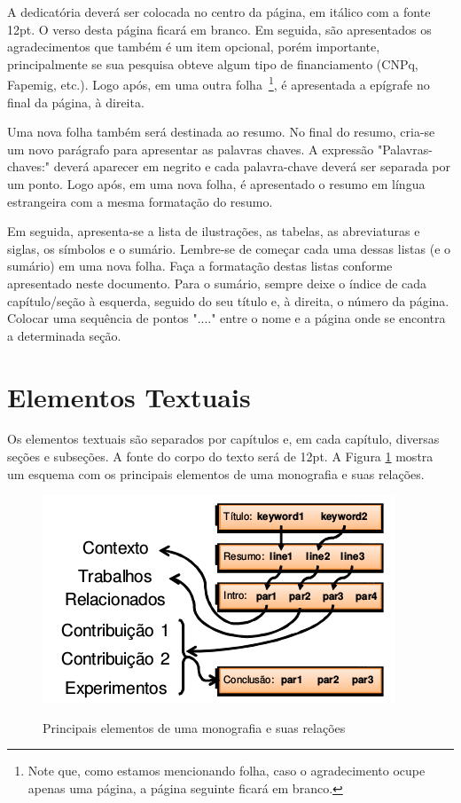 A dedicatória deverá ser colocada no centro da página, em itálico com a fonte 12pt. O verso desta página ficará em branco. Em seguida, são apresentados os agradecimentos que também é um item opcional, porém importante, principalmente se sua pesquisa obteve algum tipo de financiamento (CNPq, Fapemig, etc.).  Logo após, em uma outra folha~\footnote{Note que, como estamos mencionando folha, caso o agradecimento ocupe apenas uma página, a página seguinte ficará em branco.}, é apresentada a epígrafe no final da página, à direita.

Uma nova folha também será destinada ao resumo. No final do resumo, cria-se um novo parágrafo para apresentar as palavras chaves. A expressão "Palavras-chaves:" deverá aparecer em negrito e cada palavra-chave deverá ser separada por um ponto. Logo após, em uma nova folha, é apresentado o resumo em língua estrangeira com a mesma formatação do resumo.

Em seguida, apresenta-se a lista de ilustrações, as tabelas, as abreviaturas e siglas, os símbolos e o sumário. Lembre-se de começar cada uma dessas listas (e o sumário) em uma nova folha. Faça a formatação destas listas conforme apresentado neste documento. Para o sumário, sempre deixe o índice de cada capítulo/seção à esquerda, seguido do seu título e, à direita, o número da página. Colocar uma sequência de pontos "...." entre o nome e a página onde se encontra a determinada seção. 


\section{Elementos Textuais}
\label{sec:textual}

Os elementos textuais são separados por capítulos e, em cada capítulo, diversas seções e subseções. A fonte do corpo do texto será de 12pt. A Figura \ref{fig:elementosMonografia} mostra um esquema com os principais elementos de uma monografia e suas relações.

\begin{figure}[htb!]
    \centering
    \caption{Principais elementos de uma monografia e suas relações}
    \includegraphics[keepaspectratio=true,scale=0.8]
    	{img/modelo_trabalho_academico.png}
    \label{fig:elementosMonografia}
\end{figure}



